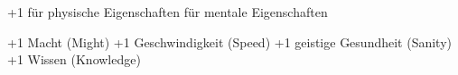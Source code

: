 
+1 für physische Eigenschaften
 \physicals {} für mentale Eigenschaften
 \mentals \mental

+1 Macht (Might) \might
+1 Geschwindigkeit (Speed) \speed
+1 geistige Gesundheit (Sanity) \sanity
+1 Wissen (Knowledge) \know